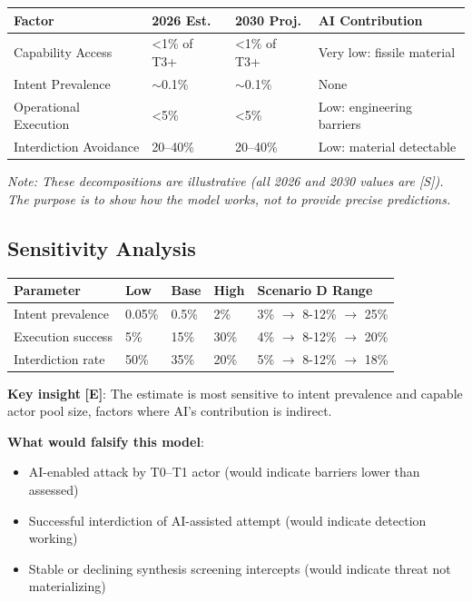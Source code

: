\documentclass[11pt,letterpaper]{article}
\begin{document}
\begin{center}
\small
\begin{tabular}{L{3cm}L{2.5cm}L{2.5cm}L{4cm}}
\toprule
\textbf{Factor} & \textbf{2026 Est.} & \textbf{2030 Proj.} & \textbf{AI Contribution} \\
\midrule
Capability Access & <1\% of T3+ & <1\% of T3+ & Very low: fissile material \\
Intent Prevalence & $\sim$0.1\% & $\sim$0.1\% & None \\
Operational Execution & <5\% & <5\% & Low: engineering barriers \\
Interdiction Avoidance & 20--40\% & 20--40\% & Low: material detectable \\
\bottomrule
\end{tabular}
\end{center}

\textit{Note: These decompositions are illustrative (all 2026 and 2030 values are [S]). The purpose is to show how the model works, not to provide precise predictions.}

\subsection{Sensitivity Analysis}

\begin{center}
\small
\begin{tabular}{L{3cm}L{2cm}L{2cm}L{2cm}L{3cm}}
\toprule
\textbf{Parameter} & \textbf{Low} & \textbf{Base} & \textbf{High} & \textbf{Scenario D Range} \\
\midrule
Intent prevalence & 0.05\% & 0.5\% & 2\% & 3\% $\to$ 8-12\% $\to$ 25\% \\
Execution success & 5\% & 15\% & 30\% & 4\% $\to$ 8-12\% $\to$ 20\% \\
Interdiction rate & 50\% & 35\% & 20\% & 5\% $\to$ 8-12\% $\to$ 18\% \\
\bottomrule
\end{tabular}
\end{center}

\textbf{Key insight} \textbf{[E]}: The estimate is most sensitive to intent prevalence and capable actor pool size, factors where AI's contribution is indirect.

\textbf{What would falsify this model}:
\begin{itemize}[nosep]
  \item AI-enabled attack by T0--T1 actor (would indicate barriers lower than assessed)
  \item Successful interdiction of AI-assisted attempt (would indicate detection working)
  \item Stable or declining synthesis screening intercepts (would indicate threat not materializing)
\end{itemize}
\end{document}
